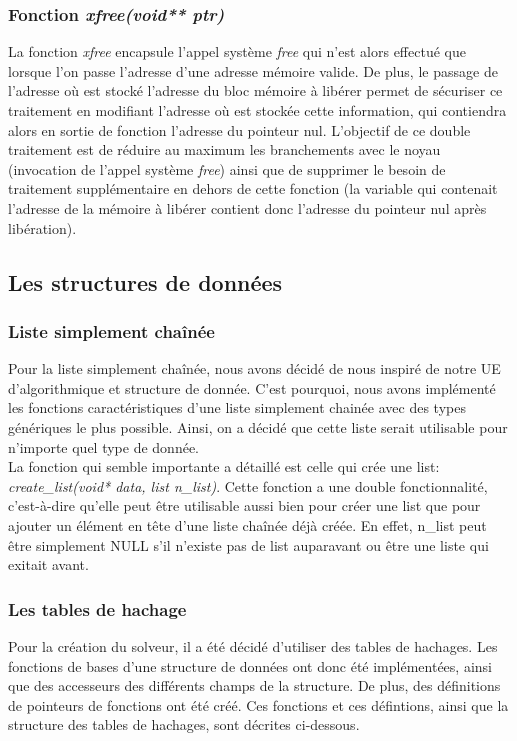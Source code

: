 \documentclass{report}
\begin{document}
\subsubsection*{Fonction \textit{xfree(void** ptr)}}
La fonction \textit{xfree} encapsule l'appel système \textit{free} qui n'est alors effectué que lorsque l'on passe l'adresse d'une adresse mémoire valide.
De plus, le passage de l'adresse où est stocké l'adresse du bloc mémoire à libérer permet de sécuriser ce traitement en modifiant l'adresse où est stockée cette information, qui contiendra alors en sortie de fonction l'adresse du pointeur nul.
L'objectif de ce double traitement est de réduire au maximum les branchements avec le noyau (invocation de l'appel système \textit{free}) ainsi que de supprimer le besoin de traitement supplémentaire en dehors de cette fonction (la variable qui contenait l'adresse de la mémoire à libérer contient donc l'adresse du pointeur nul après libération).


\subsection{Les structures de données}
\subsubsection{Liste simplement chaînée}
Pour la liste simplement chaînée, nous avons décidé de nous inspiré de notre UE d'algorithmique et structure de donnée. C'est pourquoi, nous avons implémenté les fonctions caractéristiques d'une liste simplement chainée avec des types génériques le plus possible. Ainsi, on a décidé que cette liste serait utilisable pour n'importe quel type de donnée.\\
La fonction qui semble importante a détaillé est celle qui crée une list: \textit{create\_list(void* data, list n\_list)}.
Cette fonction a une double fonctionnalité, c'est-à-dire qu'elle peut être utilisable aussi bien pour créer une list que pour ajouter un élément en tête d'une liste chaînée déjà créée. En effet, n\_list peut être simplement NULL s'il n'existe pas de list auparavant ou être une liste qui exitait avant.
\subsubsection{Les tables de hachage}
Pour la création du solveur, il a été décidé d'utiliser des tables de hachages. Les fonctions de bases d'une structure de données ont donc été implémentées, ainsi que des accesseurs des différents champs de la structure. De plus, des définitions de pointeurs de fonctions ont été créé. Ces fonctions et ces défintions, ainsi que la structure des tables de hachages, sont décrites ci-dessous.
\end{document}
